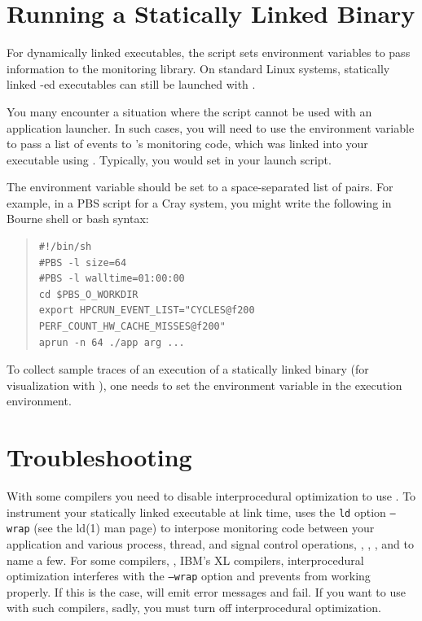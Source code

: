 \documentclass[11pt,twoside,letterpaper]{report}
\begin{document}

\section{Running a Statically Linked Binary}

For dynamically linked executables, the \hpcrun{} script sets environment variables to pass information to the \HPCToolkit{} monitoring library.
On standard Linux systems, statically linked \hpclink{}-ed executables can still be launched with \hpcrun{}.

You many encounter a situation where the \hpcrun{} script cannot be used with an application launcher.
In such cases, you will need to use the  environment variable to pass a list of events to \HPCToolkit{}'s monitoring code, which was linked into your executable using \hpclink{}.
Typically, you would set  in your launch script.

The  environment variable should be set to a space-separated list of  pairs.
For example, in a PBS script for a Cray system, you might write the following in Bourne shell or bash syntax:
\begin{quote}
\begin{verbatim}
#!/bin/sh
#PBS -l size=64
#PBS -l walltime=01:00:00
cd $PBS_O_WORKDIR
export HPCRUN_EVENT_LIST="CYCLES@f200 PERF_COUNT_HW_CACHE_MISSES@f200"
aprun -n 64 ./app arg ...
\end{verbatim}
\end{quote}

To collect sample traces of  an execution of a statically linked binary (for visualization with \hpctraceviewer{}), one needs to set the environment variable  in the execution environment.



\section{Troubleshooting}

With some compilers you need to disable interprocedural optimization to use \hpclink{}.
To instrument your statically linked executable at link time, \hpclink{} uses the \texttt{ld} option \texttt{--wrap} (see the ld(1) man page) to interpose monitoring code between your application and various process, thread, and signal control operations, \eg{}, , , and  to name a few.
For some compilers, \eg{}, IBM's XL compilers, interprocedural optimization interferes with the \texttt{--wrap} option and prevents \hpclink{} from working properly.
If this is the case, \hpclink{} will emit error messages and fail.
If you want to use \hpclink{} with such compilers, sadly, you must turn off interprocedural optimization.
\end{document}
